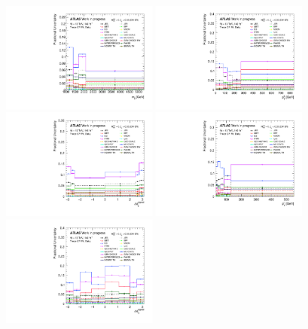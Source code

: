 \begin{figure}[t]
  \centering
  \includegraphics[width=0.49\textwidth]{plots/diffx/final/data/3cr/Systematic_Uncertainties_data_mjj_3cr_QCD_Sh2211_0p01sigma.pdf}
  \includegraphics[width=0.49\textwidth]{plots/diffx/final/data/3cr/Systematic_Uncertainties_data_jj_pt_3cr_QCD_Sh2211_0p01sigma.pdf}
  \includegraphics[width=0.49\textwidth]{plots/diffx/final/data/3cr/Systematic_Uncertainties_data_jj_dphi_3cr_QCD_Sh2211_0p01sigma.pdf}
  \includegraphics[width=0.49\textwidth]{plots/diffx/final/data/3cr/Systematic_Uncertainties_data_lep_pt_3cr_QCD_Sh2211_0p01sigma.pdf}
  \includegraphics[width=0.49\textwidth]{plots/diffx/final/data/3cr/Systematic_Uncertainties_data_lepgam_dphi_3cr_QCD_Sh2211_0p01sigma.pdf}

\end{figure}

